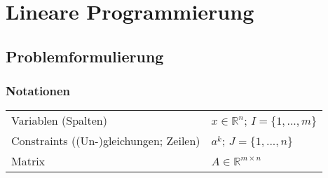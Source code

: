 \section{Lineare Programmierung }

\subsection{Problemformulierung}
  \subsubsection{Notationen}
    \begin{tabular}{p{6cm} l}
      Variablen (Spalten) & $x \in \mathbb{R}^n$; $I = \{1, ..., m\}$ \\
      Constraints ((Un-)gleichungen; Zeilen) & $a^k$; $J = \{1, ..., n\}$ \\
      Matrix & $A \in \mathbb{R}^{m \times n}$
    \end{tabular}
    
